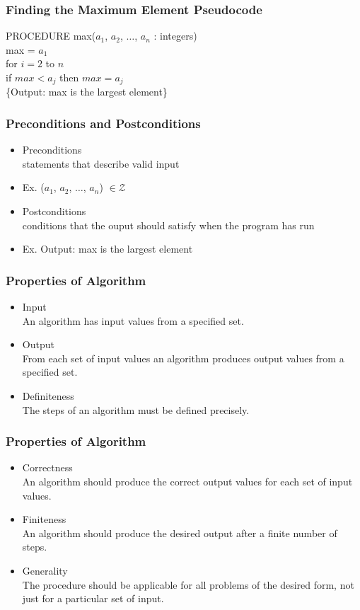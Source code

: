 \documentclass{beamer}
\begin{document}
\begin{frame}
\frametitle{\huge Finding the Maximum Element Pseudocode}
 \Large
 
PROCEDURE max($a_1$, $a_2$, $\ldots$, $a_n$ : integers) \\
\quad max = $a_1$ \\
\quad for $i = 2$ to $n$ \\
\qquad if $max < a_j$ then $max = a_j$ \\
\{Output: max is the largest element\}
\end{frame} 


\begin{frame}
\frametitle{\huge Preconditions and Postconditions}
\begin{itemize} 
\Large
\item <1-> Preconditions \\  statements that describe valid input
\item <2-> Ex. ($a_1$, $a_2$, $\ldots$, $a_n$) $\in \mathcal{Z}$ 
\item <3-> Postconditions \\ conditions that the ouput should satisfy when the program has run
\item <4-> Ex. Output: max is the largest element
\end{itemize}
\end{frame} 


\begin{frame}
\frametitle{\huge Properties of Algorithm}
\begin{itemize} 
\Large
\item <1-> Input \\ An algorithm has input values from a specified set.
\item <2-> Output \\ From each set of input values an algorithm produces output values from a specified set.
\item <3-> Definiteness \\ The steps of an algorithm must be defined precisely.
\end{itemize}
\end{frame} 


\begin{frame}
\frametitle{\huge Properties of Algorithm}
\begin{itemize} 
\Large
\item <1-> Correctness \\ An algorithm should produce the correct output values for each set of input values.
\item <2->  Finiteness \\ An algorithm should produce the desired output after a finite number of steps.
\item <3-> Generality \\ The procedure should be applicable for all problems of the desired form, not just for a particular set of input.  
\end{itemize}
\end{frame}
\end{document}
